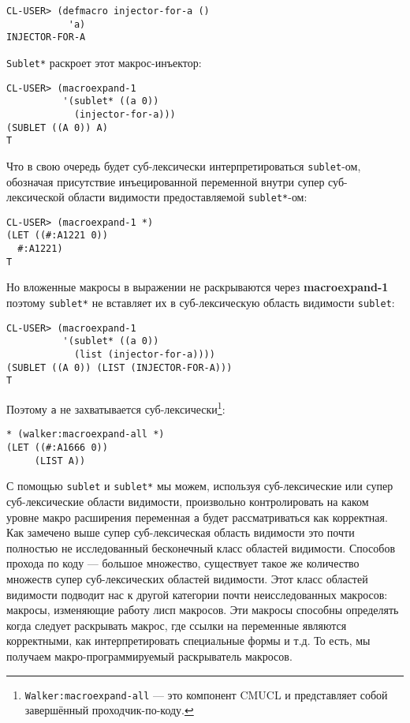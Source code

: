 \begin{verbatim}
CL-USER> (defmacro injector-for-a ()
           'a)
INJECTOR-FOR-A
\end{verbatim}

\verb"Sublet*" раскроет этот макрос-инъектор:

\begin{verbatim}
CL-USER> (macroexpand-1
          '(sublet* ((a 0))
            (injector-for-a)))
(SUBLET ((A 0)) A)
T
\end{verbatim}

Что в свою очередь будет суб-лексически интерпретироваться \verb"sublet"-ом, обозначая присутствие инъецированной переменной внутри супер суб-лексической области видимости предоставляемой \verb"sublet*"-ом:

\begin{verbatim}
CL-USER> (macroexpand-1 *)
(LET ((#:A1221 0))
  #:A1221)
T
\end{verbatim}

Но вложенные макросы в выражении не раскрываются через \textbf{mac\-ro\-ex\-pand-1} поэтому \verb"sublet*" не вставляет их в суб-лексическую область видимости \verb"sublet":

\begin{verbatim}
CL-USER> (macroexpand-1
          '(sublet* ((a 0))
            (list (injector-for-a))))
(SUBLET ((A 0)) (LIST (INJECTOR-FOR-A)))
T
\end{verbatim}

Поэтому \verb"a" не захватывается суб-лексически\footnote{\verb"Walker:macroexpand-all" --- это компонент CMUCL и представляет собой завершённый проходчик-по-коду.}:



\begin{verbatim}
* (walker:macroexpand-all *)
(LET ((#:A1666 0))
     (LIST A))
\end{verbatim}

С помощью \verb"sublet" и \verb"sublet*" мы можем, используя суб-лексические или супер суб-лексические области видимости, произвольно контролировать на каком уровне макро расширения переменная \verb"a" будет рассматриваться как корректная. Как замечено выше супер суб-лексическая область видимости это почти полностью не исследованный бесконечный класс областей видимости. Способов прохода по коду --- большое множество, существует такое же количество множеств супер суб-лексических областей видимости. Этот класс областей видимости подводит нас к другой категории почти неисследованных макросов: макросы, изменяющие работу лисп макросов. Эти макросы способны определять когда следует раскрывать макрос, где ссылки на переменные являются корректными, как интерпретировать специальные формы и т.д. То есть, мы получаем макро-программируемый раскрыватель макросов.

